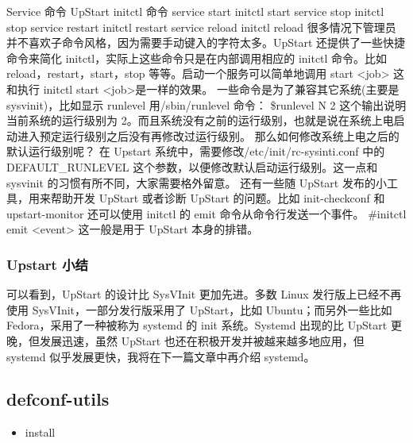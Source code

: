 \documentclass[a4paper,10pt,english]{sphinxmanual}
\begin{document}
Service 命令  UpStart initctl 命令
service start   initctl start
service stop    initctl stop
service restart initctl restart
service reload  initctl reload
很多情况下管理员并不喜欢子命令风格，因为需要手动键入的字符太多。UpStart 还提供了一些快捷命令来简化 initctl，实际上这些命令只是在内部调用相应的 initctl 命令。比如 reload，restart，start，stop 等等。启动一个服务可以简单地调用
start \textless{}job\textgreater{}
这和执行 initctl start \textless{}job\textgreater{}是一样的效果。
一些命令是为了兼容其它系统(主要是 sysvinit)，比如显示 runlevel 用/sbin/runlevel 命令：
\$runlevel
N 2
这个输出说明当前系统的运行级别为 2。而且系统没有之前的运行级别，也就是说在系统上电启动进入预定运行级别之后没有再修改过运行级别。
那么如何修改系统上电之后的默认运行级别呢？
在 Upstart 系统中，需要修改/etc/init/rc-sysinti.conf 中的 DEFAULT\_RUNLEVEL 这个参数，以便修改默认启动运行级别。这一点和 sysvinit 的习惯有所不同，大家需要格外留意。
还有一些随 UpStart 发布的小工具，用来帮助开发 UpStart 或者诊断 UpStart 的问题。比如 init-checkconf 和 upstart-monitor
还可以使用 initctl 的 emit 命令从命令行发送一个事件。
\#initctl emit \textless{}event\textgreater{}
这一般是用于 UpStart 本身的排错。


\subsubsection{Upstart 小结}
\label{\detokenize{linux/point:id4}}
可以看到，UpStart 的设计比 SysVInit 更加先进。多数 Linux 发行版上已经不再使用 SysVInit，一部分发行版采用了 UpStart，比如 Ubuntu；而另外一些比如 Fedora，采用了一种被称为 systemd 的 init 系统。Systemd 出现的比 UpStart 更晚，但发展迅速，虽然 UpStart 也还在积极开发并被越来越多地应用，但 systemd 似乎发展更快，我将在下一篇文章中再介绍 systemd。


\subsection{defconf-utils}
\label{\detokenize{linux/point:defconf-utils}}\begin{itemize}
\item {} 
install

\begin{sphinxVerbatim}[commandchars=\\\{\}]
  
\end{sphinxVerbatim}

\end{itemize}
\end{document}
